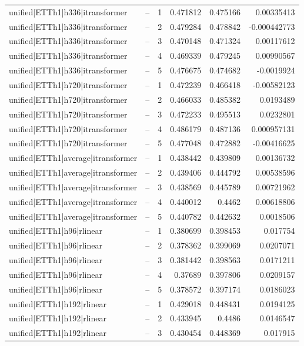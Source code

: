 \begin{longtable}{llrrrr}
unified|ETTh1|h336|itransformer & -- & 1 & 0.471812 & 0.475166 & 0.00335413 \\
unified|ETTh1|h336|itransformer & -- & 2 & 0.479284 & 0.478842 & -0.000442773 \\
unified|ETTh1|h336|itransformer & -- & 3 & 0.470148 & 0.471324 & 0.00117612 \\
unified|ETTh1|h336|itransformer & -- & 4 & 0.469339 & 0.479245 & 0.00990567 \\
unified|ETTh1|h336|itransformer & -- & 5 & 0.476675 & 0.474682 & -0.0019924 \\
unified|ETTh1|h720|itransformer & -- & 1 & 0.472239 & 0.466418 & -0.00582123 \\
unified|ETTh1|h720|itransformer & -- & 2 & 0.466033 & 0.485382 & 0.0193489 \\
unified|ETTh1|h720|itransformer & -- & 3 & 0.472233 & 0.495513 & 0.0232801 \\
unified|ETTh1|h720|itransformer & -- & 4 & 0.486179 & 0.487136 & 0.000957131 \\
unified|ETTh1|h720|itransformer & -- & 5 & 0.477048 & 0.472882 & -0.00416625 \\
unified|ETTh1|average|itransformer & -- & 1 & 0.438442 & 0.439809 & 0.00136732 \\
unified|ETTh1|average|itransformer & -- & 2 & 0.439406 & 0.444792 & 0.00538596 \\
unified|ETTh1|average|itransformer & -- & 3 & 0.438569 & 0.445789 & 0.00721962 \\
unified|ETTh1|average|itransformer & -- & 4 & 0.440012 & 0.4462 & 0.00618806 \\
unified|ETTh1|average|itransformer & -- & 5 & 0.440782 & 0.442632 & 0.0018506 \\
unified|ETTh1|h96|rlinear & -- & 1 & 0.380699 & 0.398453 & 0.017754 \\
unified|ETTh1|h96|rlinear & -- & 2 & 0.378362 & 0.399069 & 0.0207071 \\
unified|ETTh1|h96|rlinear & -- & 3 & 0.381442 & 0.398563 & 0.0171211 \\
unified|ETTh1|h96|rlinear & -- & 4 & 0.37689 & 0.397806 & 0.0209157 \\
unified|ETTh1|h96|rlinear & -- & 5 & 0.378572 & 0.397174 & 0.0186023 \\
unified|ETTh1|h192|rlinear & -- & 1 & 0.429018 & 0.448431 & 0.0194125 \\
unified|ETTh1|h192|rlinear & -- & 2 & 0.433945 & 0.4486 & 0.0146547 \\
unified|ETTh1|h192|rlinear & -- & 3 & 0.430454 & 0.448369 & 0.017915 \\

\end{longtable}
